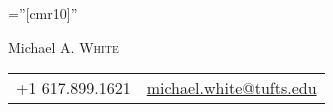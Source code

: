 \documentclass[letterpaper,10pt]{article}
\begin{document}

\pagestyle{empty} %

\font\fb=''[cmr10]'' %

\par{\centering
		{\Huge Michael A. \textsc{White}
	}\bigskip\par}


\begin{center}
\begin{tabular}{lr}
    +1 617.899.1621           &
     \href{mailto:michael.white@tufts.edu}{michael.white@tufts.edu}     %
\end{tabular}
\end{center}

\end{document}
